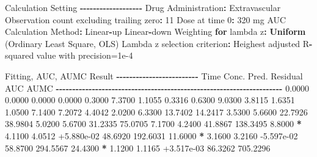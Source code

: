 \documentclass[
  12pt,
]{krantz}
\newenvironment{Shaded}{\begin{snugshade}}{\end{snugshade}}
\newcommand{\ControlFlowTok}[1]{\textcolor[rgb]{0.13,0.29,0.53}{\textbf{#1}}}
\newcommand{\DecValTok}[1]{\textcolor[rgb]{0.00,0.00,0.81}{#1}}
\newcommand{\FloatTok}[1]{\textcolor[rgb]{0.00,0.00,0.81}{#1}}
\newcommand{\KeywordTok}[1]{\textcolor[rgb]{0.13,0.29,0.53}{\textbf{#1}}}
\newcommand{\NormalTok}[1]{#1}
\newcommand{\OperatorTok}[1]{\textcolor[rgb]{0.81,0.36,0.00}{\textbf{#1}}}
\newcommand{\StringTok}[1]{\textcolor[rgb]{0.31,0.60,0.02}{#1}}
\begin{document}
\begin{Shaded}
\begin{Highlighting}[]
\NormalTok{Calculation Setting}
\OperatorTok{{-}{-}{-}{-}{-}{-}{-}{-}{-}{-}{-}{-}{-}{-}{-}{-}{-}{-}{-}}
\NormalTok{Drug Administration}\OperatorTok{:}\StringTok{ }\NormalTok{Extravascular}
\NormalTok{Observation count excluding trailing zero}\OperatorTok{:}\StringTok{ }\DecValTok{11}
\NormalTok{Dose at time }\DecValTok{0}\OperatorTok{:}\StringTok{ }\DecValTok{320}\NormalTok{ mg}
\NormalTok{AUC Calculation Method}\OperatorTok{:}\StringTok{ }\NormalTok{Linear}\OperatorTok{{-}}\NormalTok{up Linear}\OperatorTok{{-}}\NormalTok{down}
\NormalTok{Weighting }\ControlFlowTok{for}\NormalTok{ lambda z}\OperatorTok{:}\StringTok{ }\KeywordTok{Uniform}\NormalTok{ (Ordinary Least Square, OLS)}
\NormalTok{Lambda z selection criterion}\OperatorTok{:}\StringTok{ }\NormalTok{Heighest adjusted R}\OperatorTok{{-}}\NormalTok{squared value with precision=}\FloatTok{1e{-}4}


\NormalTok{Fitting, AUC, AUMC Result}
\OperatorTok{{-}{-}{-}{-}{-}{-}{-}{-}{-}{-}{-}{-}{-}{-}{-}{-}{-}{-}{-}{-}{-}{-}{-}{-}{-}}
\StringTok{      }\NormalTok{Time         Conc.      Pred.   Residual       AUC       AUMC}
\OperatorTok{{-}{-}{-}{-}{-}{-}{-}{-}{-}{-}{-}{-}{-}{-}{-}{-}{-}{-}{-}{-}{-}{-}{-}{-}{-}{-}{-}{-}{-}{-}{-}{-}{-}{-}{-}{-}{-}{-}{-}{-}{-}{-}{-}{-}{-}{-}{-}{-}{-}{-}{-}{-}{-}{-}{-}{-}{-}{-}{-}{-}{-}{-}{-}{-}{-}{-}{-}{-}{-}}
\StringTok{     }\FloatTok{0.0000}       \FloatTok{0.0000}                           \FloatTok{0.0000}     \FloatTok{0.0000}
     \FloatTok{0.3000}       \FloatTok{7.3700}                           \FloatTok{1.1055}     \FloatTok{0.3316}
     \FloatTok{0.6300}       \FloatTok{9.0300}                           \FloatTok{3.8115}     \FloatTok{1.6351}
     \FloatTok{1.0500}       \FloatTok{7.1400}                           \FloatTok{7.2072}     \FloatTok{4.4042}
     \FloatTok{2.0200}       \FloatTok{6.3300}                          \FloatTok{13.7402}    \FloatTok{14.2417}
     \FloatTok{3.5300}       \FloatTok{5.6600}                          \FloatTok{22.7926}    \FloatTok{38.9804}
     \FloatTok{5.0200}       \FloatTok{5.6700}                          \FloatTok{31.2335}    \FloatTok{75.0705}
     \FloatTok{7.1700}       \FloatTok{4.2400}                          \FloatTok{41.8867}   \FloatTok{138.3495}
     \FloatTok{8.8000} \OperatorTok{*}\StringTok{     }\FloatTok{4.1100}     \FloatTok{4.0512} \FloatTok{+5.880e{-}02}    \FloatTok{48.6920}   \FloatTok{192.6031}
    \FloatTok{11.6000} \OperatorTok{*}\StringTok{     }\FloatTok{3.1600}     \FloatTok{3.2160} \FloatTok{{-}5.597e{-}02}    \FloatTok{58.8700}   \FloatTok{294.5567}
    \FloatTok{24.4300} \OperatorTok{*}\StringTok{     }\FloatTok{1.1200}     \FloatTok{1.1165} \FloatTok{+3.517e{-}03}    \FloatTok{86.3262}   \FloatTok{705.2296}


\end{Highlighting}
\end{Shaded}
\end{document}
